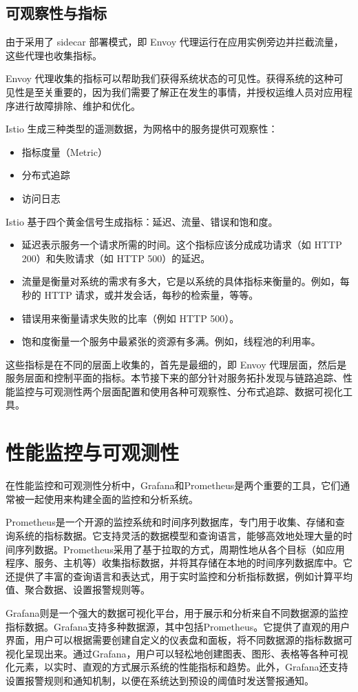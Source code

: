 \subsection{可观察性与指标}
由于采用了 sidecar 部署模式，即 Envoy 代理运行在应用实例旁边并拦截流量，这些代理也收集指标。

Envoy 代理收集的指标可以帮助我们获得系统状态的可见性。获得系统的这种可见性是至关重要的，因为我们需要了解正在发生的事情，并授权运维人员对应用程序进行故障排除、维护和优化。

Istio 生成三种类型的遥测数据，为网格中的服务提供可观察性\cite{istio-data}：
\begin{itemize}
	\item 指标度量（Metric）
	\item 分布式追踪
	\item 访问日志
\end{itemize}
Istio 基于四个黄金信号生成指标：延迟、流量、错误和饱和度。
\begin{itemize}
	\item 延迟表示服务一个请求所需的时间。这个指标应该分成成功请求（如 HTTP 200）和失败请求（如 HTTP 500）的延迟。
	\item 流量是衡量对系统的需求有多大，它是以系统的具体指标来衡量的。例如，每秒的 HTTP 请求，或并发会话，每秒的检索量，等等。
	\item 错误用来衡量请求失败的比率（例如 HTTP 500）。
	\item 饱和度衡量一个服务中最紧张的资源有多满。例如，线程池的利用率。
\end{itemize}
这些指标是在不同的层面上收集的，首先是最细的，即 Envoy 代理层面，然后是服务层面和控制平面的指标。本节接下来的部分针对服务拓扑发现与链路追踪、性能监控与可观测性两个层面配置和使用各种可观察性、分布式追踪、数据可视化工具。
\section{性能监控与可观测性}
在性能监控和可观测性分析中，Grafana和Prometheus是两个重要的工具，它们通常被一起使用来构建全面的监控和分析系统。

Prometheus是一个开源的监控系统和时间序列数据库，专门用于收集、存储和查询系统的指标数据。它支持灵活的数据模型和查询语言，能够高效地处理大量的时间序列数据。Prometheus采用了基于拉取的方式，周期性地从各个目标（如应用程序、服务、主机等）收集指标数据，并将其存储在本地的时间序列数据库中。它还提供了丰富的查询语言和表达式，用于实时监控和分析指标数据，例如计算平均值、聚合数据、设置报警规则等。

Grafana则是一个强大的数据可视化平台，用于展示和分析来自不同数据源的监控指标数据。Grafana支持多种数据源，其中包括Prometheus。它提供了直观的用户界面，用户可以根据需要创建自定义的仪表盘和面板，将不同数据源的指标数据可视化呈现出来。通过Grafana，用户可以轻松地创建图表、图形、表格等各种可视化元素，以实时、直观的方式展示系统的性能指标和趋势。此外，Grafana还支持设置报警规则和通知机制，以便在系统达到预设的阈值时发送警报通知。

